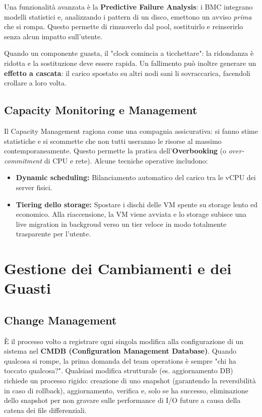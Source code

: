 Una funzionalità avanzata è la \textbf{Predictive Failure Analysis}: i BMC integrano modelli statistici e, analizzando i pattern di un disco, emettono un avviso \textit{prima} che si rompa. Questo permette di rimuoverlo dal pool, sostituirlo e reinserirlo senza alcun impatto sull'utente.
\begin{warningbox}
Quando un componente guasta, il "clock comincia a ticchettare": la ridondanza è ridotta e la sostituzione deve essere rapida. Un fallimento può inoltre generare un \textbf{effetto a cascata}: il carico spostato su altri nodi sani li sovraccarica, facendoli crollare a loro volta.
\end{warningbox}

\subsection{Capacity Monitoring e Management}
Il Capacity Management ragiona come una compagnia assicurativa: si fanno stime statistiche e si scommette che non tutti useranno le risorse al massimo contemporaneamente. Questo permette la pratica dell'\textbf{Overbooking} (o \textit{over-commitment} di CPU e rete).
Alcune tecniche operative includono:
\begin{itemize}
    \item \textbf{Dynamic scheduling:} Bilanciamento automatico del carico tra le vCPU dei server fisici.
    \item \textbf{Tiering dello storage:} Spostare i dischi delle VM spente su storage lento ed economico. Alla riaccensione, la VM viene avviata e lo storage subisce una live migration in backgroud verso un tier veloce in modo totalmente trasparente per l'utente.
\end{itemize}

\section{Gestione dei Cambiamenti e dei Guasti}

\subsection{Change Management}
È il processo volto a registrare ogni singola modifica alla configurazione di un sistema nel \textbf{CMDB (Configuration Management Database)}. Quando qualcosa si rompe, la prima domanda del team operations è sempre "chi ha toccato qualcosa?". Qualsiasi modifica strutturale (es. aggiornamento DB) richiede un processo rigido: creazione di uno snapshot (garantendo la reversibilità in caso di rollback), aggiornamento, verifica e, solo se ha successo, eliminazione dello snapshot per non gravare sulle performance di I/O future a causa della catena dei file differenziali.

